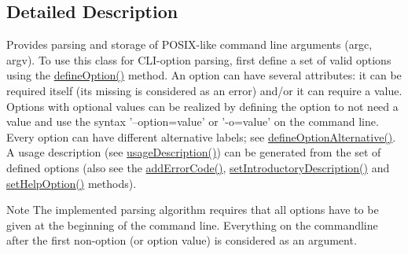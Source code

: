 \subsection{Detailed Description}
Provides parsing and storage of P\-O\-S\-I\-X-\/like command line arguments (argc, argv). To use this class for C\-L\-I-\/option parsing, first define a set of valid options using the \hyperlink{class_command_line_processing_1_1_argv_parser_ab0194879d739c6e14afaa5c810f2bcf2}{define\-Option()} method. An option can have several attributes\-: it can be required itself (its missing is considered as an error) and/or it can require a value. Options with optional values can be realized by defining the option to not need a value and use the syntax '--option=value' or '-\/o=value' on the command line. Every option can have different alternative labels; see \hyperlink{class_command_line_processing_1_1_argv_parser_afd327b1fa074f9054180ffe67cb39591}{define\-Option\-Alternative()}. A usage description (see \hyperlink{class_command_line_processing_1_1_argv_parser_a3de10de9b05caa7b753545ce04891866}{usage\-Description()}) can be generated from the set of defined options (also see the \hyperlink{class_command_line_processing_1_1_argv_parser_ad0150ccee56870979c638be0dbb1ceb9}{add\-Error\-Code()}, \hyperlink{class_command_line_processing_1_1_argv_parser_a2e94bfc66abdfc54fb506c75c3ce919c}{set\-Introductory\-Description()} and \hyperlink{class_command_line_processing_1_1_argv_parser_a3c8f22197ce39d35655195b6d34ee2e1}{set\-Help\-Option()} methods). \begin{DoxyNote}{Note}
The implemented parsing algorithm requires that all options have to be given at the beginning of the command line. Everything on the commandline after the first non-\/option (or option value) is considered as an argument. 
\end{DoxyNote}
